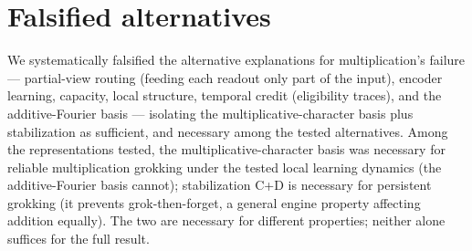 \documentclass[11pt]{article}
\begin{document}
\section{Falsified alternatives}\label{sec:falsified}
We systematically falsified the alternative explanations for multiplication's failure --- partial-view routing (feeding each readout only part of the input), encoder learning, capacity, local structure, temporal credit (eligibility traces), and the additive-Fourier basis --- isolating the multiplicative-character basis plus stabilization as sufficient, and necessary among the tested alternatives. Among the representations tested, the multiplicative-character basis was necessary for reliable multiplication grokking under the tested local learning dynamics (the additive-Fourier basis cannot); stabilization C+D is necessary for persistent grokking (it prevents grok-then-forget, a general engine property affecting addition equally). The two are necessary for different properties; neither alone suffices for the full result.
\end{document}
